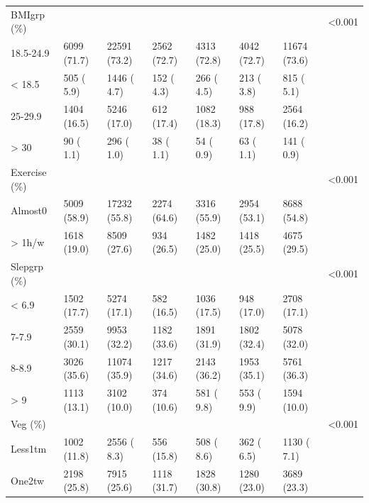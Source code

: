 \documentclass[]{tufte-handout}
\begin{document}
\begin{table}[ht]
\begin{tabular}[t]{llllllll}
\rowcolor{gray!6}  BMIgrp (\%) &  &  &  &  &  &  & <0.001\\
\hspace{1em}18.5-24.9 & 6099 (71.7) & 22591 (73.2) & 2562 (72.7) & 4313 (72.8) & 4042 (72.7) & 11674 (73.6) & \\
\rowcolor{gray!6}  \hspace{1em}< 18.5 & 505 ( 5.9) & 1446 ( 4.7) & 152 ( 4.3) & 266 ( 4.5) & 213 ( 3.8) & 815 ( 5.1) & \\
\hspace{1em}25-29.9 & 1404 (16.5) & 5246 (17.0) & 612 (17.4) & 1082 (18.3) & 988 (17.8) & 2564 (16.2) & \\
\rowcolor{gray!6}  \hspace{1em}> 30 & 90 ( 1.1) & 296 ( 1.0) & 38 ( 1.1) & 54 ( 0.9) & 63 ( 1.1) & 141 ( 0.9) & \\
Exercise (\%) &  &  &  &  &  &  & <0.001\\
\rowcolor{gray!6}  \hspace{1em}Almost0 & 5009 (58.9) & 17232 (55.8) & 2274 (64.6) & 3316 (55.9) & 2954 (53.1) & 8688 (54.8) & \\
\hspace{1em}> 1h/w & 1618 (19.0) & 8509 (27.6) & 934 (26.5) & 1482 (25.0) & 1418 (25.5) & 4675 (29.5) & \\
\rowcolor{gray!6}  Slepgrp (\%) &  &  &  &  &  &  & <0.001\\
\hspace{1em}< 6.9 & 1502 (17.7) & 5274 (17.1) & 582 (16.5) & 1036 (17.5) & 948 (17.0) & 2708 (17.1) & \\
\rowcolor{gray!6}  \hspace{1em}7-7.9 & 2559 (30.1) & 9953 (32.2) & 1182 (33.6) & 1891 (31.9) & 1802 (32.4) & 5078 (32.0) & \\
\hspace{1em}8-8.9 & 3026 (35.6) & 11074 (35.9) & 1217 (34.6) & 2143 (36.2) & 1953 (35.1) & 5761 (36.3) & \\
\rowcolor{gray!6}  \hspace{1em}> 9 & 1113 (13.1) & 3102 (10.0) & 374 (10.6) & 581 ( 9.8) & 553 ( 9.9) & 1594 (10.0) & \\
Veg (\%) &  &  &  &  &  &  & <0.001\\
\rowcolor{gray!6}  \hspace{1em}Less1tm & 1002 (11.8) & 2556 ( 8.3) & 556 (15.8) & 508 ( 8.6) & 362 ( 6.5) & 1130 ( 7.1) & \\
\hspace{1em}One2tw & 2198 (25.8) & 7915 (25.6) & 1118 (31.7) & 1828 (30.8) & 1280 (23.0) & 3689 (23.3) & \\

\end{tabular}
\end{table}
\end{document}
